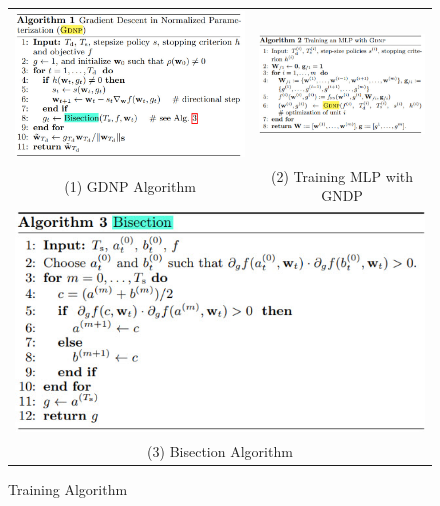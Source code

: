 \documentclass{article}
\begin{document}
\begin{figure}[h]
\begin{tabular}{cc}
  \includegraphics[scale=0.38]{pics/batchNorm/decoupling_alg1.jpg} & 
  \includegraphics[scale=0.58]{pics/batchNorm/decoupling_alg2.jpg}
  \\
(1) GDNP Algorithm & (2) Training MLP with GNDP\\[6pt]
\multicolumn{2}{c}{\includegraphics[scale=0.6]{pics/batchNorm/decoupling_alg3.jpg} }\\
\multicolumn{2}{c}{(3) Bisection Algorithm }
\end{tabular}
\caption{Training Algorithm}
\label{fig:algorithms}
\end{figure}
\end{document}
